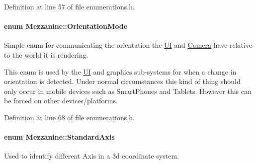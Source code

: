 Definition at line 57 of file enumerations.\-h.

\hypertarget{namespaceMezzanine_a8892173bd6aaf7d0e34a07b2b30aad33}{
\paragraph[{Orientation\-Mode}]{\setlength{\rightskip}{0pt plus 5cm}enum {\bf Mezzanine\-::\-Orientation\-Mode}}}\label{namespaceMezzanine_a8892173bd6aaf7d0e34a07b2b30aad33}


Simple enum for communicating the orientation the \hyperlink{namespaceMezzanine_1_1UI}{U\-I} and \hyperlink{classMezzanine_1_1Camera}{Camera} have relative to the world it is rendering. 

This enum is used by the \hyperlink{namespaceMezzanine_1_1UI}{U\-I} and graphics sub-\/systems for when a change in orientation is detected. Under normal circumstances this kind of thing should only occur in mobile devices such as Smart\-Phones and Tablets. However this can be forced on other devices/platforms. 

Definition at line 68 of file enumerations.\-h.

\hypertarget{namespaceMezzanine_ab41a00a8c6a47b576dc987ec34e16ba1}{
\paragraph[{Standard\-Axis}]{\setlength{\rightskip}{0pt plus 5cm}enum {\bf Mezzanine\-::\-Standard\-Axis}}}\label{namespaceMezzanine_ab41a00a8c6a47b576dc987ec34e16ba1}


Used to identify different Axis in a 3d coordinate system. 

